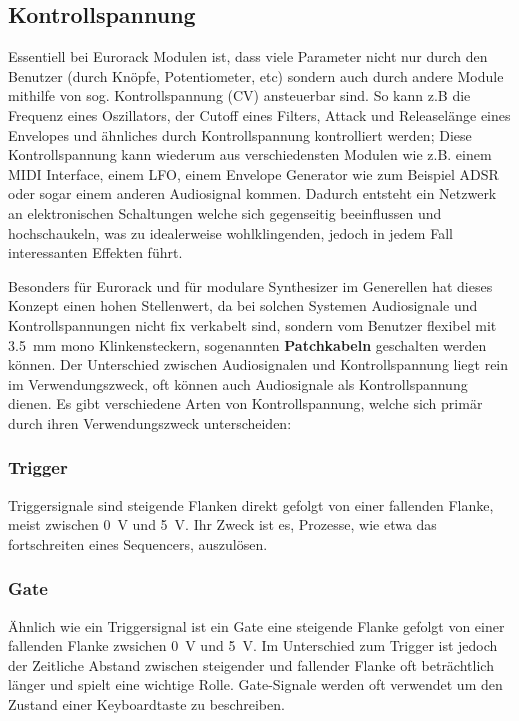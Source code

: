 \subsection{Kontrollspannung}
\label{sec:orgea80b26}
Essentiell bei Eurorack Modulen ist, dass viele Parameter nicht nur durch den Benutzer (durch Knöpfe, Potentiometer, etc) sondern auch durch andere Module mithilfe von sog. Kontrollspannung (CV) ansteuerbar sind. So kann z.B die Frequenz eines Oszillators, der Cutoff eines Filters, Attack und Releaselänge eines Envelopes und ähnliches durch Kontrollspannung kontrolliert werden; Diese Kontrollspannung kann wiederum aus verschiedensten Modulen wie z.B. einem MIDI Interface, einem LFO, einem Envelope Generator wie zum Beispiel ADSR oder sogar einem anderen Audiosignal kommen. Dadurch entsteht ein Netzwerk an elektronischen Schaltungen welche sich gegenseitig beeinflussen und hochschaukeln, was zu idealerweise wohlklingenden, jedoch in jedem Fall interessanten Effekten führt.

Besonders für Eurorack und für modulare Synthesizer im Generellen hat dieses Konzept einen hohen Stellenwert, da bei solchen Systemen Audiosignale und Kontrollspannungen nicht fix verkabelt sind, sondern vom Benutzer flexibel mit \SI{3.5}{\milli\meter} mono Klinkensteckern, sogenannten \textbf{Patchkabeln} geschalten werden können. Der Unterschied zwischen Audiosignalen und Kontrollspannung liegt rein im Verwendungszweck, oft können auch Audiosignale als Kontrollspannung dienen. Es gibt verschiedene Arten von Kontrollspannung, welche sich primär durch ihren Verwendungszweck unterscheiden:

\subsubsection{Trigger}
\label{sec:org49acd24}
Triggersignale sind steigende Flanken direkt gefolgt von einer fallenden Flanke, meist zwischen \SI{0}{\volt} und \SI{5}{\volt}. Ihr Zweck ist es, Prozesse, wie etwa das fortschreiten eines Sequencers, auszulösen.

\subsubsection{Gate}
\label{sec:org7dc7171}
Ähnlich wie ein Triggersignal ist ein Gate eine steigende Flanke gefolgt von einer fallenden Flanke zwsichen \SI{0}{\volt} und \SI{5}{\volt}. Im Unterschied zum Trigger ist jedoch der Zeitliche Abstand zwischen steigender und fallender Flanke oft beträchtlich länger und spielt eine wichtige Rolle. Gate-Signale werden oft verwendet um den Zustand einer Keyboardtaste zu beschreiben.

